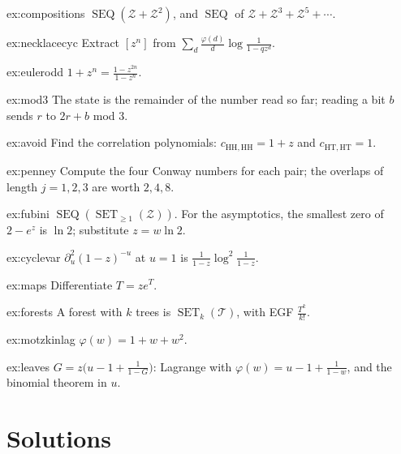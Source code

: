 \begin{hint}{ex:compositions}
$\operatorname{SEQ}(\mathcal Z+\mathcal Z^2)$, and $\operatorname{SEQ}$ of $\mathcal Z+\mathcal Z^3+\mathcal Z^5+\cdots$.
\end{hint}
\begin{hint}{ex:necklacecyc}
Extract $[z^n]$ from $\sum_d\frac{\varphi(d)}d\log\frac1{1-qz^d}$.
\end{hint}
\begin{hint}{ex:eulerodd}
$1+z^n=\frac{1-z^{2n}}{1-z^n}$.
\end{hint}
\begin{hint}{ex:mod3}
The state is the remainder of the number read so far; reading a bit $b$ sends $r$ to $2r+b$ mod $3$.
\end{hint}
\begin{hint}{ex:avoid}
Find the correlation polynomials: $c_{\mathrm{HH,HH}}=1+z$ and $c_{\mathrm{HT,HT}}=1$.
\end{hint}
\begin{hint}{ex:penney}
Compute the four Conway numbers for each pair; the overlaps of length $j=1,2,3$ are worth $2,4,8$.
\end{hint}
\begin{hint}{ex:fubini}
$\operatorname{SEQ}(\operatorname{SET}_{\ge1}(\mathcal Z))$. For the asymptotics, the smallest zero of $2-e^z$ is $\ln2$; substitute $z=w\ln2$.
\end{hint}
\begin{hint}{ex:cyclevar}
$\partial_u^2(1-z)^{-u}$ at $u=1$ is $\frac1{1-z}\log^2\frac1{1-z}$.
\end{hint}
\begin{hint}{ex:maps}
Differentiate $T=ze^T$.
\end{hint}
\begin{hint}{ex:forests}
A forest with $k$ trees is $\operatorname{SET}_k(\mathcal T)$, with EGF $\frac{T^k}{k!}$.
\end{hint}
\begin{hint}{ex:motzkinlag}
$\varphi(w)=1+w+w^2$.
\end{hint}
\begin{hint}{ex:leaves}
$G=z\big(u-1+\frac1{1-G}\big)$: Lagrange with $\varphi(w)=u-1+\frac1{1-w}$, and the binomial theorem in $u$.
\end{hint}

\section{Solutions}

